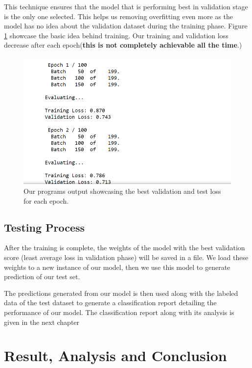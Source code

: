 \documentclass[a4paper, 12pt]{article}
\begin{document}
\begin{sloppypar}
  This technique ensures that the model that is performing best in validation stage is the only one selected. This helps us removing overfitting even more as the model has no idea about the validation dataset during the training phase. Figure \ref{eval} showcase the basic idea behind training. Our training and validation loss decrease after each epoch(\textbf{this is not completely achievable all the time}.)
  \begin{figure}[H]
  \begin{center}
  \includegraphics[scale=0.65]{eval.png}
  \caption{Our programs output showcasing the best validation and test loss for each epoch.\label{eval}}
  \end{center}
  \end{figure}
  \subsection{Testing Process}
  
  After the training is complete, the weights of the model with the best validation score (least average loss in validation phase) will be saved in a file. We load these weights to a new instance of our model, then we use this model to generate prediction of our test set.
  
  The predictions generated from our model is then used along with the labeled data of the test dataset to generate a classification report detailing the performance of our model. The classification report along with its analysis is given in the next chapter
  \clearpage
  \section{Result, Analysis and Conclusion}
  

\end{sloppypar}
\end{document}
